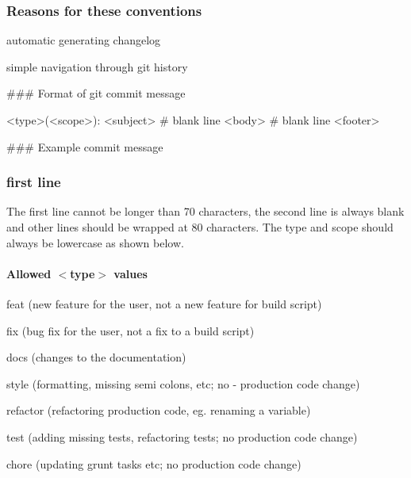 \subsubsection*{Reasons for these conventions}


\begin{DoxyItemize}
\item automatic generating changelog
\item simple navigation through git history
\end{DoxyItemize}

\#\#\# Format of git commit message 
\begin{DoxyCode}
<type>(<scope>): <subject>
# blank line
<body>
# blank line
<footer>
\end{DoxyCode}
 \#\#\# Example commit message 
 \subsubsection*{first line}

The first line cannot be longer than 70 characters, the second line is always blank and other lines should be wrapped at 80 characters. The type and scope should always be lowercase as shown below. \paragraph*{Allowed $<$type$>$ values}


\begin{DoxyItemize}
\item feat (new feature for the user, not a new feature for build script)
\item fix (bug fix for the user, not a fix to a build script)
\item docs (changes to the documentation)
\item style (formatting, missing semi colons, etc; no -\/ production code change)
\item refactor (refactoring production code, eg. renaming a variable)
\item test (adding missing tests, refactoring tests; no production code change)
\item chore (updating grunt tasks etc; no production code change)
\end{DoxyItemize}

